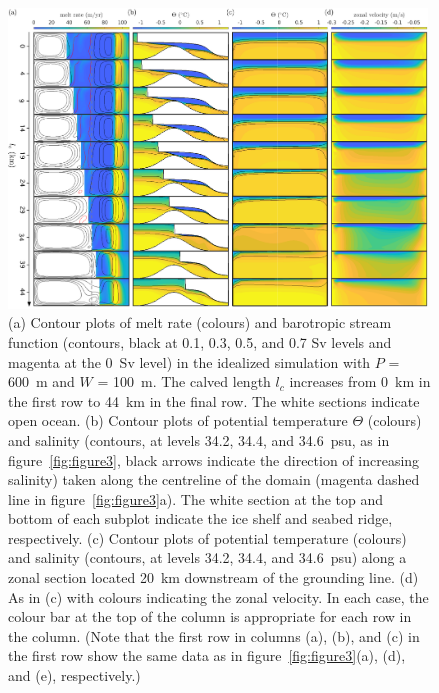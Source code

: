\documentclass[draft]{agujournal2019}
\begin{document}
\begin{figure}
    \centering
    \includegraphics[width = 0.99\textwidth]{../make_figures/plots/figure5_axislabel.pdf}
    \caption{(a) Contour plots of melt rate (colours) and barotropic stream function (contours, black at 0.1, 0.3, 0.5, and 0.7 Sv levels and magenta at the 0~Sv level) in the idealized simulation with $P$ = 600~m and $W$ = 100~m. The calved length $l_c$ increases from 0~km in the first row to 44~km in the final row. The white sections indicate open ocean. (b) Contour plots of potential temperature $\Theta$ (colours) and salinity (contours, at levels 34.2, 34.4, and 34.6~psu, as in figure~\ref{fig:figure3}, black arrows indicate the direction of increasing salinity) taken along the centreline of the domain (magenta dashed line in figure~\ref{fig:figure3}a). The white section at the top and bottom of each subplot indicate the ice shelf and seabed ridge, respectively. (c) Contour plots of potential temperature (colours) and salinity (contours, at levels 34.2, 34.4, and 34.6~psu) along a zonal section located 20~km downstream of the grounding line. (d) As in (c) with colours indicating the zonal velocity.  In each case, the colour bar at the top of the column is appropriate for each row in the column. (Note that the first row in columns (a), (b), and (c) in the first row show the same data as in figure~\ref{fig:figure3}(a), (d), and (e), respectively.) }
    \label{fig:figure5}
\end{figure}
\end{document}
